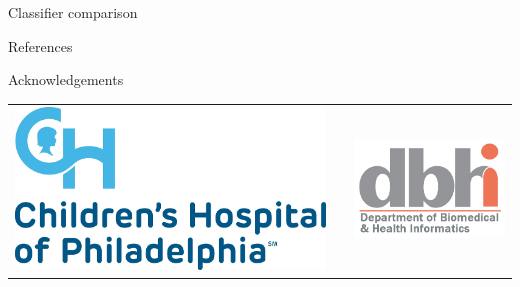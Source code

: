 \begin{column}{\onecolwid}
\begin{block}{Classifier comparison}
\end{block}


\begin{block}{References}

\nocite{*} %
\small{
\vspace{0.75in}}

\end{block}




\begin{block}{Acknowledgements}
\centering
\small{} \\

\end{block}


\begin{center}
\begin{tabular}{ccc}
\includegraphics[width=0.4\linewidth]{figs/chop.jpg} & \hfill & \includegraphics[width=0.4\linewidth]{figs/dbhi.png}
\end{tabular}
\end{center}


\end{column} %